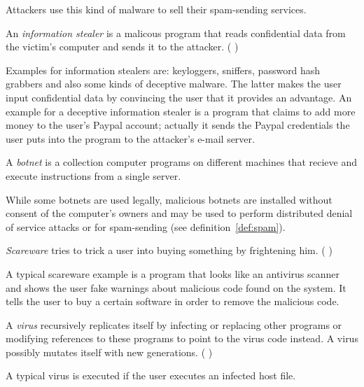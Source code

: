 Attackers use this kind of malware to sell their spam-sending services.

\begin{definition}
An \emph{information stealer} is a malicous program that reads confidential data from the victim's computer and sends it to the attacker. (\cf{} \cite[]{sikorski12})
\end{definition} 

Examples for information stealers are: keyloggers, sniffers, password hash grabbers \cite[]{sikorski12} and also some kinds of deceptive malware. The latter makes the user input confidential data by convincing the user that it provides an advantage. An example for a deceptive information stealer is a program that claims to add more money to the user's Paypal account; actually it sends the Paypal credentials the user puts into the program to the attacker's e-mail server.

\begin{definition}[Botnet]
A \emph{botnet} is a collection computer programs on different machines that recieve and execute instructions from a single server.
\end{definition} 

While some botnets are used legally, malicious botnets are installed without consent of the computer's owners and may be used to perform distributed denial of service attacks or for spam-sending (see definition~\ref{def:spam}).

\begin{definition}
\emph{Scareware} tries to trick a user into buying something by frightening him. (\cf{} \cite[]{sikorski12})
\end{definition} 

A typical scareware example is a program that looks like an antivirus scanner and shows the user fake warnings about malicious code found on the system. It tells the user to buy a certain software in order to remove the malicious code.

\begin{definition}[Virus]
A \emph{virus} recursively replicates itself by infecting or replacing other programs or modifying references to these programs to point to the virus code instead. A virus possibly mutates itself with new generations. (\cf{} \cite[]{szor05})
\end{definition} 

A typical virus is executed if the user executes an infected host file.

